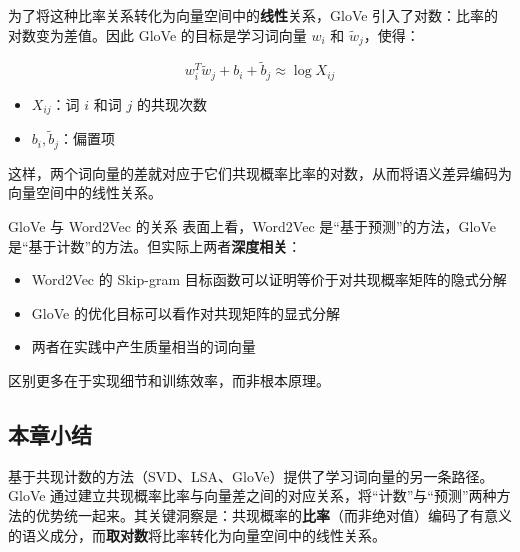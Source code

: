 为了将这种比率关系转化为向量空间中的\textbf{线性}关系，GloVe 引入了对数：比率的对数变为差值。因此 GloVe 的目标是学习词向量 $w_i$ 和 $\tilde{w}_j$，使得：

$$w_i^T \tilde{w}_j + b_i + \tilde{b}_j \approx \log X_{ij}$$

\begin{itemize}
    \item $X_{ij}$：词 $i$ 和词 $j$ 的共现次数
    \item $b_i, \tilde{b}_j$：偏置项
\end{itemize}

这样，两个词向量的差就对应于它们共现概率比率的对数，从而将语义差异编码为向量空间中的线性关系。

\begin{knowledgebox}{GloVe 与 Word2Vec 的关系}
表面上看，Word2Vec 是``基于预测''的方法，GloVe 是``基于计数''的方法。但实际上两者\textbf{深度相关}：
\begin{itemize}
    \item Word2Vec 的 Skip-gram 目标函数可以证明等价于对共现概率矩阵的隐式分解
    \item GloVe 的优化目标可以看作对共现矩阵的显式分解
    \item 两者在实践中产生质量相当的词向量
\end{itemize}
区别更多在于实现细节和训练效率，而非根本原理。
\end{knowledgebox}

\subsection{本章小结}

基于共现计数的方法（SVD、LSA、GloVe）提供了学习词向量的另一条路径。GloVe 通过建立共现概率比率与向量差之间的对应关系，将``计数''与``预测''两种方法的优势统一起来。其关键洞察是：共现概率的\textbf{比率}（而非绝对值）编码了有意义的语义成分，而\textbf{取对数}将比率转化为向量空间中的线性关系。


